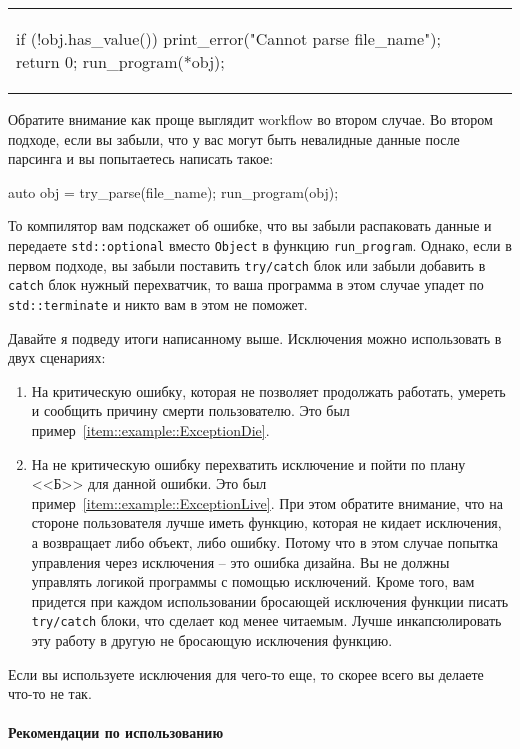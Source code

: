 \begin{enumerate}
\begin{center}
\begin{tabular}{ll}
{\begin{minipage}[\baselineskip]{8cm}
\begin{cppcode}[numbers = none]
if (!obj.has_value()) {
  print_error("Cannot parse file_name");
  return 0;
}
run_program(*obj);
\end{cppcode}
\end{minipage}
}\\
\end{tabular}
\end{center}
Обратите внимание как проще выглядит workflow во втором случае.
Во втором подходе, если вы забыли, что у вас могут быть невалидные данные после парсинга и вы попытаетесь написать такое:
\begin{cppcode}
auto obj = try_parse(file_name);
run_program(obj);
\end{cppcode}
То компилятор вам подскажет об ошибке, что вы забыли распаковать данные и передаете \verb"std::optional" вместо \verb"Object" в функцию \verb"run_program".
Однако, если в первом подходе, вы забыли поставить \verb"try/catch" блок или забыли добавить в \verb"catch" блок нужный перехватчик, то ваша программа в этом случае упадет по \verb"std::terminate" и никто вам в этом не поможет.
\end{enumerate}
Давайте я подведу итоги написанному выше.
Исключения можно использовать в двух сценариях:
\begin{enumerate}
\item На критическую ошибку, которая не позволяет продолжать работать, умереть и сообщить причину смерти пользователю.
Это был пример~\ref{item::example::ExceptionDie}.

\item На не критическую ошибку перехватить исключение и пойти по плану <<Б>> для данной ошибки.
Это был пример~\ref{item::example::ExceptionLive}.
При этом обратите внимание, что на стороне пользователя лучше иметь функцию, которая не кидает исключения, а возвращает либо объект, либо ошибку.
Потому что в этом случае попытка управления через исключения -- это ошибка дизайна.
Вы не должны управлять логикой программы с помощью исключений.
Кроме того, вам придется при каждом использовании бросающей исключения функции писать \verb"try/catch" блоки, что сделает код менее читаемым.
Лучше инкапсюлировать эту работу в другую не бросающую исключения функцию.
\end{enumerate}
Если вы используете исключения для чего-то еще, то скорее всего вы делаете что-то не так.

\paragraph{Рекомендации по использованию}


